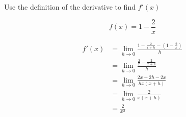 \documentclass[letterpaper, landscape]{exam}
\begin{document}
\begin{questions}
\begin{solution}
      \end{solution}



      \question[10] Use the definition of the derivative to find $f'(x)$

      \label{derivative:last}
      \[
        f(x) = 1 - \frac{2}{x}
      \]

      \begin{solution}
        \begin{align*}
          f'(x) & = \lim_{h \to 0} \frac{1 - \frac{2}{x + h} - \left( 1 - \frac{2}{x} \right)}{h} \\
                &= \lim_{h \to 0} \frac{\frac{2}{x} - \frac{2}{x+h}}{h} \\
                &= \lim_{h \to 0} \frac{2x + 2h - 2x}{hx(x + h)} \\
                &= \lim_{h \to 0} \frac{2}{x(x + h)} \\
                &= \boxed{ \frac{2}{x^2} } \\
        \end{align*}
      \end{solution}
      

\end{questions}
\end{document}
